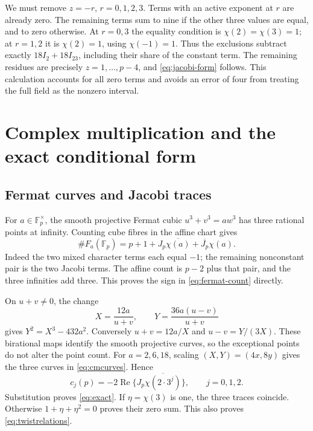 \documentclass[11pt]{article}
\theoremstyle{definition}\newtheorem{definition}[theorem]{Definition}
\newcommand{\Fp}{\mathbb F_p}
\newcommand{\Rea}{\operatorname{Re}}
\begin{document}
We must remove $z=-r$, $r=0,1,2,3$.
Terms with an active exponent at $r$ are already zero.
The remaining terms sum to nine if the other three values
are equal, and to zero otherwise. At $r=0,3$ the equality
condition is $\chi(2)=\chi(3)=1$; at $r=1,2$ it is
$\chi(2)=1$, using $\chi(-1)=1$.
Thus the exclusions subtract exactly
$18I_2+18I_{23}$, including their share of the constant term.
The remaining residues are precisely $z=1,\ldots,p-4$,
and \eqref{eq:jacobi-form} follows.
This calculation accounts for all zero terms and avoids an
error of four from treating the full field as the nonzero interval.

\section{Complex multiplication and the exact conditional form}\label{sec:CM}
\subsection{Fermat curves and Jacobi traces}
For $a\in\Fp^\times$, the smooth projective Fermat cubic
$u^3+v^3=aw^3$ has three rational points at infinity.
Counting cube fibres in the affine chart gives
\begin{equation}\label{eq:fermat-count}
 \#F_a(\Fp)=p+1+
 J_p\overline{\chi(a)}+\overline{J_p}\chi(a).
\end{equation}
Indeed the two mixed character terms each equal $-1$;
the remaining nonconstant pair is the two Jacobi terms.
The affine count is $p-2$ plus that pair, and the three
infinities add three. This proves the sign in
\eqref{eq:fermat-count} directly.

On $u+v\ne0$, the change
\[
 X=\frac{12a}{u+v},\qquad
 Y=\frac{36a(u-v)}{u+v}
\]
gives $Y^2=X^3-432a^2$.
Conversely $u+v=12a/X$ and $u-v=Y/(3X)$.
These birational maps identify the smooth projective curves,
so the exceptional points do not alter the point count.
For $a=2,6,18$, scaling $(X,Y)=(4x,8y)$ gives
the three curves in \eqref{eq:cmcurves}. Hence
\begin{equation}\label{eq:cm-jacobi}
 c_j(p)=-2\Rea\{J_p\overline{\chi(2\cdot3^j)}\},
 \qquad j=0,1,2.
\end{equation}
Substitution proves \eqref{eq:exact}.
If $\eta=\chi(3)$ is one, the three traces coincide.
Otherwise $1+\eta+\eta^2=0$ proves their zero sum.
This also proves \eqref{eq:twistrelations}.
\end{document}
